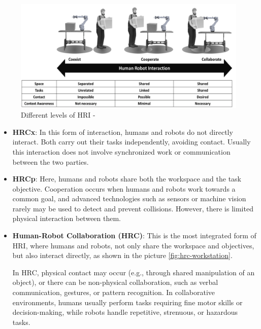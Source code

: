\begin{figure}[!htbp]
    \centering
    \includegraphics[width=1.0\linewidth]{figs/collab-coex-coopr.png}
    \caption{Different levels of \ac{HRI} - \cite{Jahanmahin2022}} 
    \label{fig:collab}
\end{figure} 

\begin{itemize}
    \item \textbf{\ac{HRCx}}: In this form of interaction, humans and robots do not directly interact.
    Both carry out their tasks independently, avoiding contact. Usually this interaction does not involve synchronized work 
    or communication between the two parties.

    \item \textbf{\ac{HRCp}}: Here, humans and robots share both the workspace and the task objective. Cooperation occurs when humans
    and robots work towards a common goal, and advanced technologies such as sensors or machine vision rarely may be used to detect and prevent collisions.
    However, there is limited physical interaction between them.

    \item \textbf{Human-Robot Collaboration (\ac{HRC})}: This is the most integrated form of \ac{HRI}, where humans and robots, not only share the workspace and
    objectives, but also interact directly, as shown in the picture \ref{fig:hrc-workstation}. 
    
    In \ac{HRC}, physical contact may occur (e.g., through shared manipulation of an object), or there can be non-physical
    collaboration, such as verbal communication, gestures, or pattern recognition. In collaborative environments, humans usually perform tasks requiring
    fine motor skills or decision-making, while robots handle repetitive, strenuous, or hazardous tasks.
\end{itemize}



